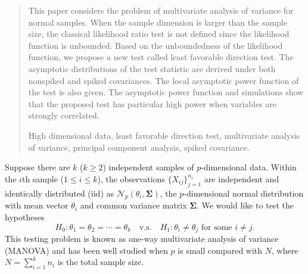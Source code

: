\documentclass[12pt]{article} %
\renewcommand{\theequation}{\thesection\arabic{equation}}
\newcommand{\bfsym}[1]{\ensuremath{\boldsymbol{#1}}}
\def\bSigma {\bfsym {\Sigma}}
\theoremstyle{definition}
\begin{document}
\begin{quotation}
This paper considers the problem of multivariate analysis of variance for normal samples.
    When the sample dimension is larger than the sample size, the classical likelihood ratio test is not defined since the likelihood function is unbounded.
    Based on the unboundedness of the likelihood function, we propose a new test called least favorable direction test.
    The asymptotic distributions of the test statistic are derived under both nonspiked and spiked covariances.
    The local asymptotic power function of the test is also given.
    The asymptotic power function and simulations show that the proposed test has particular high power when variables are strongly correlated.

\vspace{9pt}
    High dimensional data, least favorable direction test, multivariate analysis of variance, principal component analysis, spiked covariance.
\par
\end{quotation}\par



\def\thefigure{\arabic{figure}}
\def\thetable{\arabic{table}}

\renewcommand{\theequation}{\thesection.\arabic{equation}}


\fontsize{12}{14pt plus.8pt minus .6pt}\selectfont

\setcounter{section}{1} %
\setcounter{equation}{0} %

Suppose there are $k$ ($k\geq 2$) independent samples of $p$-dimensional data.
Within the $i$th sample ($1\leq i\leq k$), the observations $\{X_{ij}\}_{j=1}^{n_i}$ are independent and identically distributed (iid) as $\mathcal{N}_p(\theta_i,\bSigma)$, the $p$-dimensional normal distribution with mean vector $\theta_i$ and common variance matrix $\bSigma$.
We would like to test the hypotheses
\begin{equation}\label{hypothesis}
    H_0: \theta_1=\theta_2=\cdots=\theta_k\quad \text{v.s.}\quad　H_1: \text{$\theta_i\neq \theta_j$ for some $i\neq j$}.
\end{equation}
This testing problem is known as one-way multivariate analysis of variance (MANOVA) and has been well studied when $p$ is small compared with $N$, where $N=\sum_{i=1}^k n_i$ is the total sample size.
\end{document}
